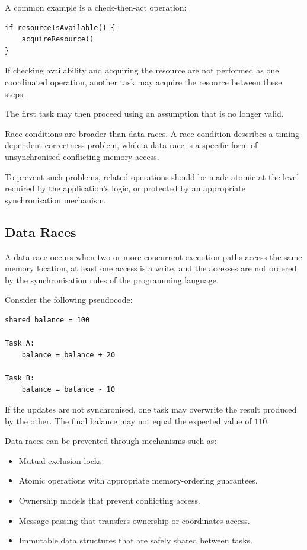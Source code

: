 A common example is a check-then-act operation:

\begin{lstlisting}
if resourceIsAvailable() {
    acquireResource()
}
\end{lstlisting}

If checking availability and acquiring the resource are not performed as one coordinated operation, another task may acquire the resource between these steps.

The first task may then proceed using an assumption that is no longer valid.

Race conditions are broader than data races. A race condition describes a timing-dependent correctness problem, while a data race is a specific form of unsynchronised conflicting memory access.

To prevent such problems, related operations should be made atomic at the level required by the application's logic, or protected by an appropriate synchronisation mechanism.

\subsection{Data Races}

A data race occurs when two or more concurrent execution paths access the same memory location, at least one access is a write, and the accesses are not ordered by the synchronisation rules of the programming language.

Consider the following pseudocode:

\begin{lstlisting}
shared balance = 100

Task A:
    balance = balance + 20

Task B:
    balance = balance - 10
\end{lstlisting}

If the updates are not synchronised, one task may overwrite the result produced by the other. The final balance may not equal the expected value of \(110\).

Data races can be prevented through mechanisms such as:

\begin{itemize}
    \item Mutual exclusion locks.
    \item Atomic operations with appropriate memory-ordering guarantees.
    \item Ownership models that prevent conflicting access.
    \item Message passing that transfers ownership or coordinates access.
    \item Immutable data structures that are safely shared between tasks.
\end{itemize}

